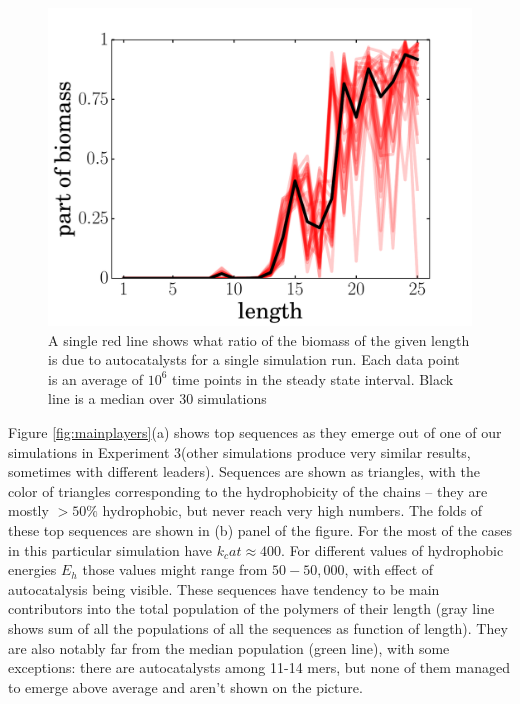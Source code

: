 \documentclass[journal=jacsat,manuscript=article,layout=twocolumn]{achemso}
\begin{document}
\begin{figure}[h!]
  \centering
  \includegraphics[width=\columnwidth]{pictures/biomass.pdf} 
  \caption{\footnotesize{A single red line shows what ratio of the biomass of the 
given length is due to autocatalysts for a single simulation run. Each data point is an average of 
$10^6$ time points in the steady state interval. Black line is a median over 30 simulations }}
  \label{fig:biomass}
\end{figure}
Figure \ref{fig:mainplayers}(a) shows top sequences as they emerge out of one of our 
simulations in Experiment 3(other simulations produce very similar results, sometimes with 
different leaders). Sequences are shown as triangles, with the color of triangles 
corresponding to the hydrophobicity of the chains -- they are mostly $>50\%$ hydrophobic, but 
never reach very high numbers. The folds of these top sequences are shown in 
(b) panel of the figure. For the most of the cases in this particular simulation have 
$k_cat\approx400$. For different values of hydrophobic energies $E_h$ those values might range 
from $50-50,000$, with effect of autocatalysis being visible. These sequences have tendency to be 
main contributors into the total population of the polymers of their length (gray line shows sum 
of all the populations of all the sequences as function of length). They are also notably far from 
the median population (green line), with some exceptions: there are autocatalysts among 11-14 
mers, but none of them managed to emerge above average and aren't shown on the picture.
\end{document}
